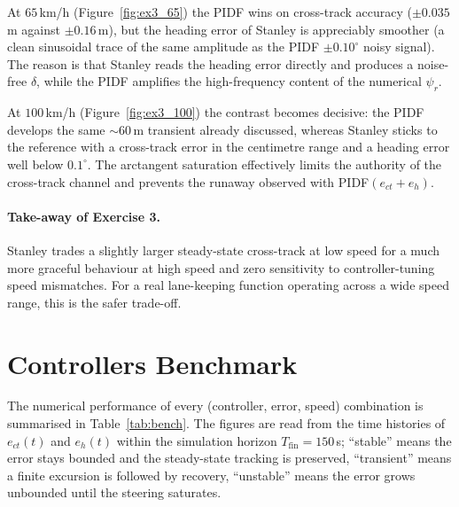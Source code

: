 At $65$\,km/h (Figure~\ref{fig:ex3_65}) the PIDF wins on cross-track
accuracy ($\pm 0.035$\,m against $\pm 0.16$\,m), but the heading
error of Stanley is appreciably smoother (a clean sinusoidal trace
of the same amplitude as the PIDF $\pm 0.10^\circ$ noisy signal).
The reason is that Stanley reads the heading error directly and
produces a noise-free $\delta$, while the PIDF amplifies the
high-frequency content of the numerical $\psi_r$.

At $100$\,km/h (Figure~\ref{fig:ex3_100}) the contrast becomes
decisive: the PIDF develops the same $\sim\!60$\,m transient already
discussed, whereas Stanley sticks to the reference with a cross-track
error in the centimetre range and a heading error well below
$0.1^\circ$. The arctangent saturation effectively limits the
authority of the cross-track channel and prevents the runaway
observed with PIDF$(e_{ct}+e_h)$.

\paragraph{Take-away of Exercise 3.}
Stanley trades a slightly larger steady-state cross-track at low
speed for a much more graceful behaviour at high speed and zero
sensitivity to controller-tuning speed mismatches. For a real
lane-keeping function operating across a wide speed range, this is
the safer trade-off.

\section{Controllers Benchmark}
\label{sec:bench}
The numerical performance of every (controller, error, speed)
combination is summarised in
Table~\ref{tab:bench}. The figures are read from the time histories
of $e_{ct}(t)$ and $e_h(t)$ within the simulation horizon
$T_\mathrm{fin}=150$\,s; ``stable'' means the error stays bounded and
the steady-state tracking is preserved, ``transient'' means a finite
excursion is followed by recovery, ``unstable'' means the error grows
unbounded until the steering saturates.

